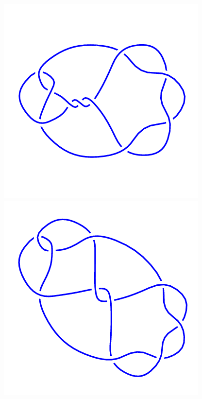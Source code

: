 \begin{figure}[H]
    \begin{minipage}[b]{.18\linewidth}
        \centering
        \includegraphics[width=\linewidth]{../data/10_12.png}
    \end{minipage}
    \begin{minipage}[b]{.18\linewidth}
        \centering
        \includegraphics[width=\linewidth]{../data/10_13.png}

\end{minipage}
\end{figure}
